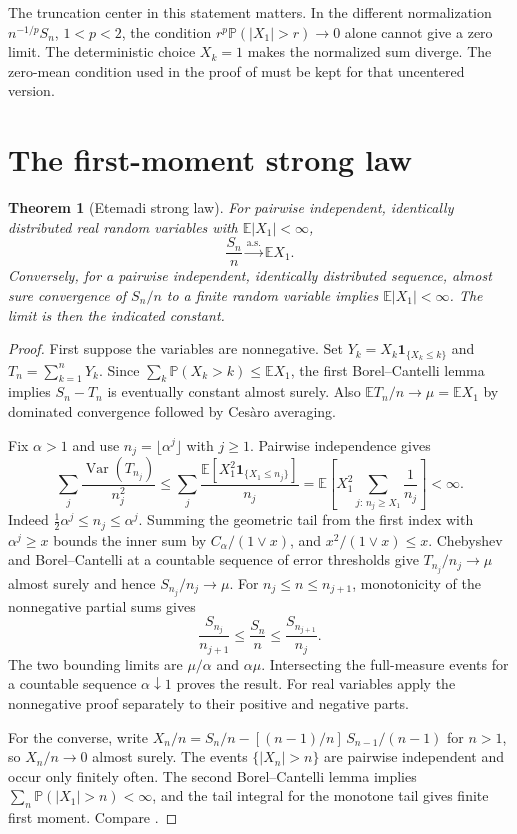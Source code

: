 \documentclass[11pt,oneside,openany]{book}
\newcommand{\Prob}{\mathbb{P}}
\newcommand{\E}{\mathbb{E}}
\DeclareMathOperator{\Var}{Var}
\newcommand{\ind}{\mathbf{1}}
\newcommand{\asto}{\xrightarrow{\mathrm{a.s.}}}
\theoremstyle{plain}
\newtheorem{theorem}{Theorem}[chapter]
\theoremstyle{definition}
\theoremstyle{remark}
\begin{document}
The truncation center in this statement matters. In the different
normalization \(n^{-1/p} S_n\), \(1<p<2\), the condition
\(r^p\Prob(|X_1|>r)\to0\) alone cannot give a zero limit.
The deterministic choice \(X_k=1\) makes the normalized sum diverge.
The zero-mean condition used in the proof of
\cite[Theorem 6.17, pp.\ 138--139]{Kallenberg} must be kept for that
uncentered version.

\section{The first-moment strong law}
\label{p08-02}

\begin{theorem}[Etemadi strong law]\label{thm:etemadi}
For pairwise independent, identically distributed real random variables
with \(\E|X_1|<\infty\),
\[
 \frac{S_n}{n}\asto \E X_1 .
\]
Conversely, for a pairwise independent, identically distributed sequence,
almost sure convergence of \(S_n/n\) to a finite random variable implies
\(\E|X_1|<\infty\). The limit is then the indicated constant.
\end{theorem}

\begin{proof}
First suppose the variables are nonnegative. Set
\(Y_k=X_k\ind_{\{X_k\le k\}}\) and \(T_n=\sum_{k=1}^nY_k\).
Since \(\sum_k\Prob(X_k>k)\le\E X_1\), the first Borel--Cantelli lemma
implies \(S_n-T_n\) is eventually constant almost surely. Also
\(\E T_n/n\to\mu=\E X_1\) by dominated convergence followed by
Ces\`aro averaging.

Fix \(\alpha>1\) and use \(n_j=\lfloor\alpha^j\rfloor\) with \(j\ge1\).
Pairwise independence gives
\[
 \sum_j \frac{\Var(T_{n_j})}{n_j^2}
 \le \sum_j \frac{\E[X_1^2\ind_{\{X_1\le n_j\}}]}{n_j}
 = \E\!\left[X_1^2\sum_{j:\,n_j\ge X_1}\frac1{n_j}\right]<\infty .
\]
Indeed \(\tfrac12\alpha^j\le n_j\le\alpha^j\). Summing the geometric
tail from the first index with \(\alpha^j\ge x\) bounds the inner
sum by \(C_\alpha/(1\vee x)\), and \(x^2/(1\vee x)\le x\).
Chebyshev and Borel--Cantelli at a countable sequence of error
thresholds give \(T_{n_j}/n_j\to\mu\) almost surely and hence
\(S_{n_j}/n_j\to\mu\). For \(n_j\le n\le n_{j+1}\), monotonicity of
the nonnegative partial sums gives
\[
 \frac{S_{n_j}}{n_{j+1}}\le \frac{S_n}{n}
 \le\frac{S_{n_{j+1}}}{n_j}.
\]
The two bounding limits are \(\mu/\alpha\) and \(\alpha\mu\).
Intersecting the full-measure events for a countable sequence
\(\alpha\downarrow1\) proves the result. For real variables apply
the nonnegative proof separately to their positive and negative parts.

For the converse, write \(X_n/n=S_n/n-[(n-1)/n]\,S_{n-1}/(n-1)\)
for \(n>1\), so \(X_n/n\to0\) almost surely. The events
\(\{|X_n|>n\}\) are pairwise independent and occur only finitely often.
The second Borel--Cantelli lemma implies \(\sum_n\Prob(|X_1|>n)<\infty\),
and the tail integral for the monotone tail gives finite first moment.
Compare \cite[Theorems 2.3.8 and 2.4.1]{Durrett}.
\end{proof}
\end{document}
